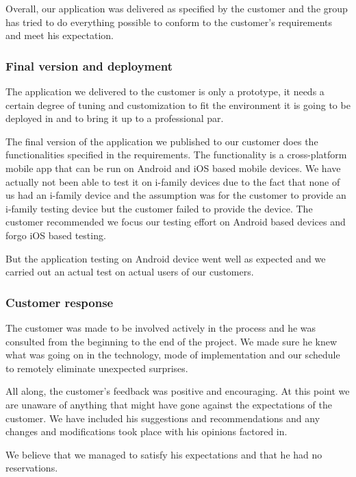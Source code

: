     Overall, our application was delivered as specified by the customer and the group has tried to do everything possible to conform to the customer's requirements and meet his expectation.
	\subsubsection{Final version and deployment}
The application we delivered to the customer is only a prototype, it needs a certain degree of tuning and customization to fit the environment it is going to be deployed in and to bring it up to a professional par.

The final version of the application we published to our customer does the functionalities specified in the requirements. The functionality is a cross-platform mobile app that can be run on Android and iOS based mobile devices. We have actually not been able to test it on i-family devices due to the fact that none of us had an i-family device and the assumption was for the customer to provide an i-family testing device but the customer failed to provide the device. The customer recommended we focus our testing effort on Android based devices and forgo iOS based testing.

But the application testing on Android device went well as expected and we carried out an actual test on actual users of our customers.


	\subsubsection{Customer response}
The customer was made to be involved actively in the process and he was consulted from the beginning to the end of the project. We made sure he knew what was going on in the technology, mode of implementation and our schedule to remotely eliminate unexpected surprises.

All along, the customer's feedback was positive and encouraging. At this point we are unaware of anything that might have gone against the expectations of the customer. 
We have included his suggestions and recommendations and any changes and modifications took place with his opinions factored in.

We believe that we managed to satisfy his expectations and that he had no reservations.
	


